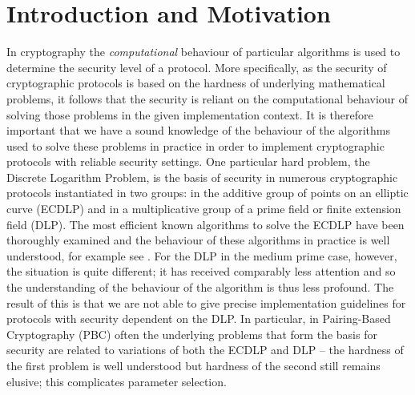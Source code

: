 \documentclass[a4paper, 10pt, envcountsect, runningheads]{lms}
\numberwithin{figure}{section}
\numberwithin{equation}{section}
\begin{document}
\section{Introduction and Motivation}
In cryptography the {\em computational} behaviour of particular algorithms is used to determine the security level of a protocol. More specifically, as the security of cryptographic protocols is based on the hardness of underlying mathematical problems, it follows that the security is reliant on the computational behaviour of solving those problems in the given implementation context. It is therefore important that we have a sound knowledge of the behaviour of the algorithms used to solve these problems in practice in order to implement cryptographic protocols with reliable security settings.
One particular hard problem, the Discrete Logarithm Problem, is the basis of security in numerous cryptographic protocols instantiated in two groups: in the additive group of points on an elliptic curve (ECDLP) and in a multiplicative group of a prime field or finite extension field (DLP). 
The most efficient known algorithms to solve the ECDLP have been thoroughly examined and the behaviour of these algorithms in practice is well understood, for example see \cite{pollard,teske,rho_chal_1,rho_chal_2,rho_efficiency}. For the DLP in the medium prime case, however, the situation is quite different; it has received comparably less attention and so the understanding of the behaviour of the algorithm is thus less profound. The result of this is that we are not able to give precise implementation guidelines for protocols with security dependent on the DLP. In particular, in Pairing-Based Cryptography (PBC) often the underlying problems that form the basis for security are related to variations of both the ECDLP and DLP -- the hardness of the first problem is well understood but hardness of the second still remains elusive; this complicates parameter selection.
\end{document}
